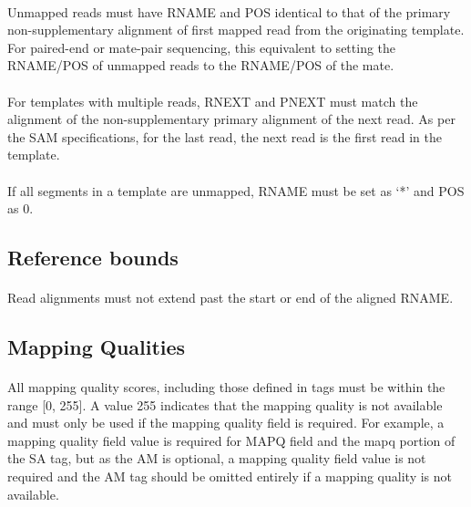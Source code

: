 \documentclass[10pt]{article}
\begin{document}
\paragraph{}

Unmapped reads must have RNAME and POS identical to that of the primary
non-supplementary alignment of first mapped read from the originating template.
For paired-end or mate-pair sequencing, this equivalent
to setting the RNAME/POS of unmapped reads to the RNAME/POS of the mate.

\paragraph{}

For templates with multiple reads, RNEXT and PNEXT must match the
alignment of the non-supplementary primary alignment of the next read.
As per the SAM specifications, for the last read, the next read is the first read in the template.

\paragraph{}

If all segments in a template are unmapped, RNAME must be set as `*' and POS as 0.

\subsection{Reference bounds}

\paragraph{}

Read alignments must not extend past the start or end of the aligned RNAME.

\subsection{Mapping Qualities}

\paragraph{}

All mapping quality scores, including those defined in tags must be within the range [0, 255].
A value 255 indicates that the mapping quality is not available and must only be used if the
mapping quality field is required. For example, a mapping quality field value is required for
MAPQ field and the mapq portion of the SA tag, but as the AM is optional, a mapping quality
field value is not required and the AM tag should be omitted entirely if a mapping quality is
not available.
\end{document}
